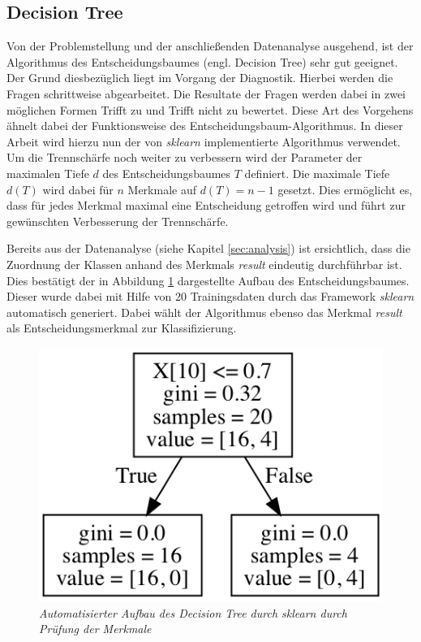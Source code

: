 \subsection{Decision Tree} \label{sec:tree}
Von der Problemstellung und der anschließenden Datenanalyse ausgehend, ist der Algorithmus des Entscheidungsbaumes (engl. \glqq Decision Tree\grqq) sehr gut geeignet. Der Grund diesbezüglich liegt im Vorgang der Diagnostik. Hierbei werden die Fragen schrittweise abgearbeitet. Die Resultate der Fragen werden dabei in zwei möglichen Formen \glqq Trifft zu\grqq{} und \glqq Trifft nicht zu\grqq{} bewertet. Diese Art des Vorgehens ähnelt dabei der Funktionsweise des Entscheidungsbaum-Algorithmus. In dieser Arbeit wird hierzu nun der von \textit{sklearn} implementierte Algorithmus verwendet. Um die Trennschärfe noch weiter zu verbessern wird der Parameter der maximalen Tiefe $d$ des Entscheidungsbaumes $T$ definiert. Die maximale Tiefe $d(T)$ wird dabei für $n$ Merkmale auf $d(T) = n-1$ gesetzt. Dies ermöglicht es, dass für jedes Merkmal maximal eine Entscheidung getroffen wird und führt zur gewünschten Verbesserung der Trennschärfe.

Bereits aus der Datenanalyse (siehe Kapitel \ref{sec:analysis}) ist ersichtlich, dass die Zuordnung der Klassen anhand des Merkmals \textit{result} eindeutig durchführbar ist. Dies bestätigt der in Abbildung \ref{fig:tree_graph} dargestellte Aufbau des Entscheidungsbaumes. Dieser wurde dabei mit Hilfe von 20 Trainingsdaten durch das Framework \textit{sklearn} automatisch generiert. Dabei wählt der Algorithmus ebenso das Merkmal \textit{result} als Entscheidungsmerkmal zur Klassifizierung.

\begin{figure}[h!]
\centering
\includegraphics[scale=0.7]{graphs/tree_graph.png}
\caption{\em Automatisierter Aufbau des Decision Tree durch \glqq sklearn\grqq{} durch Prüfung der Merkmale}
\label{fig:tree_graph}
\end{figure}